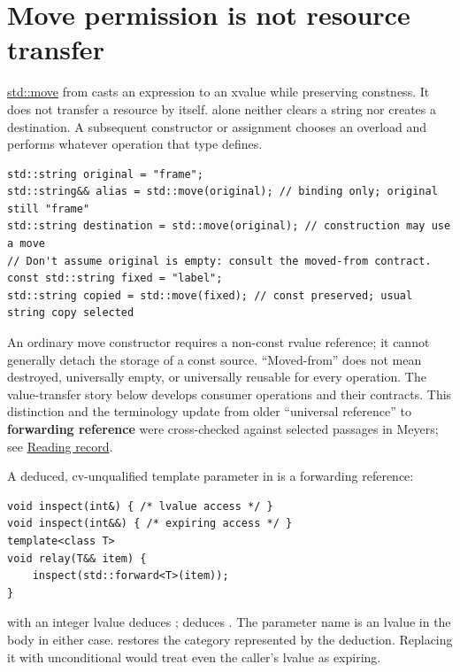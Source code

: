\section{Move permission is not resource transfer}\label{01-foundations-i-ch003-move-permission-is-not-resource-transfer}

\hypertarget{01-foundations-i-ch003-move-permission-is-not-resource-transfer}{}

\hyperref[appendix-0104b704fb11]{std::move} from  casts an expression to an xvalue while preserving constness. It does not transfer a resource by itself.  alone neither clears a string nor creates a destination. A subsequent constructor or assignment chooses an overload and performs whatever operation that type defines.

\begin{verbatim}
std::string original = "frame";
std::string&& alias = std::move(original); // binding only; original still "frame"
std::string destination = std::move(original); // construction may use a move
// Don't assume original is empty: consult the moved-from contract.
const std::string fixed = "label";
std::string copied = std::move(fixed); // const preserved; usual string copy selected
\end{verbatim}

An ordinary  move constructor requires a non-const rvalue reference; it cannot generally detach the storage of a const source. ``Moved-from'' does not mean destroyed, universally empty, or universally reusable for every operation. The value-transfer story below develops consumer operations and their contracts. This distinction and the terminology update from older ``universal reference'' to \textbf{forwarding reference} were cross-checked against selected passages in Meyers; see \hyperref[appendix-a103e7846d21-m008---borrowing-categories-and-const-access]{Reading record}.

A deduced, cv-unqualified template parameter in  is a forwarding reference:

\begin{verbatim}
void inspect(int&) { /* lvalue access */ }
void inspect(int&&) { /* expiring access */ }
template<class T>
void relay(T&& item) {
    inspect(std::forward<T>(item));
}
\end{verbatim}

 with an integer lvalue deduces ;  deduces . The parameter name  is an lvalue in the body in either case.  restores the category represented by the deduction. Replacing it with unconditional  would treat even the caller's lvalue as expiring.


